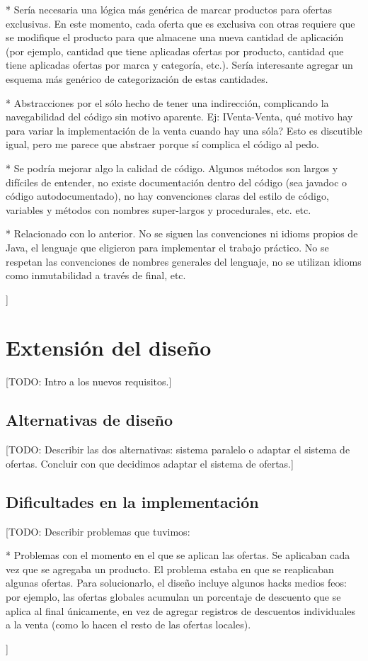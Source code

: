 \documentclass[a4paper,11pt]{article}
\begin{document}
  * Sería necesaria una lógica más genérica de marcar productos para ofertas
  exclusivas. En este momento, cada oferta que es exclusiva con otras
  requiere que se modifique el producto para que almacene una nueva cantidad de
  aplicación (por ejemplo, cantidad que tiene aplicadas ofertas por producto,
  cantidad que tiene aplicadas ofertas por marca y categoría, etc.). Sería
  interesante agregar un esquema más genérico de categorización de estas
  cantidades.

  * Abstracciones por el sólo hecho de tener una indirección, complicando la
  navegabilidad del código sin motivo aparente. Ej: IVenta-Venta, qué motivo
  hay para variar la implementación de la venta cuando hay una sóla? Esto es
  discutible igual, pero me parece que abstraer porque sí complica el código al
  pedo.

  * Se podría mejorar algo la calidad de código. Algunos métodos son largos y
  difíciles de entender, no existe documentación dentro del código (sea javadoc
  o código autodocumentado), no hay convenciones claras del estilo de código,
  variables y métodos con nombres super-largos y procedurales, etc.  etc.

  * Relacionado con lo anterior. No se siguen las convenciones ni idioms
  propios de Java, el lenguaje que eligieron para implementar el trabajo
  práctico. No se respetan las convenciones de nombres generales del lenguaje,
  no se utilizan idioms como inmutabilidad a través de final, etc.

]

\section{Extensión del diseño}

[TODO: Intro a los nuevos requisitos.]

\subsection{Alternativas de diseño}

[TODO: Describir las dos alternativas: sistema paralelo o adaptar el sistema de
ofertas. Concluir con que decidimos adaptar el sistema de ofertas.]

\subsection{Dificultades en la implementación}

[TODO: Describir problemas que tuvimos:

  * Problemas con el momento en el que se aplican las ofertas. Se aplicaban
  cada vez que se agregaba un producto. El problema estaba en que se
  reaplicaban algunas ofertas. Para solucionarlo, el diseño incluye algunos
  hacks medios feos: por ejemplo, las ofertas globales acumulan un porcentaje
  de descuento que se aplica al final únicamente, en vez de agregar registros
  de descuentos individuales a la venta (como lo hacen el resto de las ofertas
  locales).

]
\end{document}
